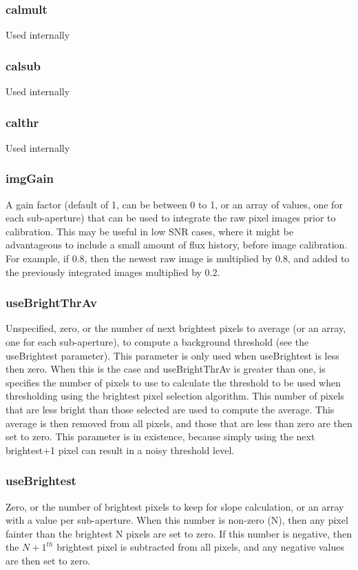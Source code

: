 \documentclass[a4,10pt]{article}
\begin{document}
\subsubsection{calmult}
Used internally
\subsubsection{calsub}
Used internally
\subsubsection{calthr}
Used internally

\subsubsection{imgGain}
A gain factor (default of 1, can be between 0 to 1, or an array of
values, one for each sub-aperture) that can be used to integrate the
raw pixel images prior to calibration.  This may be useful in low SNR
cases, where it might be advantageous to include a small amount of
flux history, before image calibration.  For example, if 0.8, then the
newest raw image is multiplied by 0.8, and added to the previously
integrated images multiplied by 0.2.

\subsubsection{useBrightThrAv}
Unspecified, zero, or the number of next brightest pixels to average
(or an array, one for each sub-aperture),
to compute a background threshold (see the useBrightest parameter).
This parameter is only used when useBrightest is less then zero.  When
this is the case and useBrightThrAv is greater than one, is specifies
the number of pixels to use to calculate the threshold to be used when
thresholding using the brightest pixel selection algorithm.  This
number of pixels that are less bright than those selected are used to
compute the average.  This average is then removed from all pixels,
and those that are less than zero are then set to zero.  This
parameter is in existence, because simply using the next brightest+1
pixel can result in a noisy threshold level.

\subsubsection{useBrightest}
Zero, or the number of brightest pixels to keep for slope calculation,
or an array with a value per sub-aperture.  When this number is
non-zero (N), then any pixel fainter than the brightest N pixels are
set to zero.  If this number is negative, then the $N+1^{th}$
brightest pixel is subtracted from all pixels, and any negative values
are then set to zero.
\end{document}
